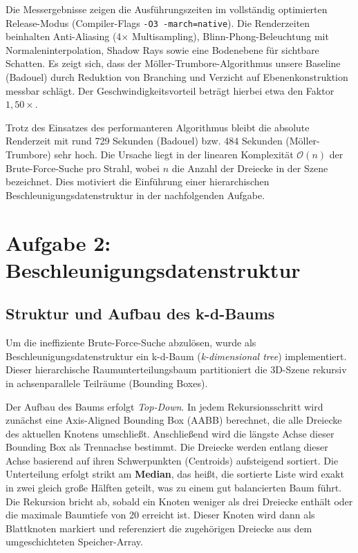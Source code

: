 \documentclass[11pt, a4paper]{article}
\begin{document}
Die Messergebnisse zeigen die Ausführungszeiten im vollständig optimierten Release-Modus (Compiler-Flags \texttt{-O3 -march=native}). Die Renderzeiten beinhalten Anti-Aliasing (4$\times$ Multisampling), Blinn-Phong-Beleuchtung mit Normaleninterpolation, Shadow Rays sowie eine Bodenebene für sichtbare Schatten. Es zeigt sich, dass der Möller-Trumbore-Algorithmus unsere Baseline (Badouel) durch Reduktion von Branching und Verzicht auf Ebenenkonstruktion messbar schlägt. Der Geschwindigkeitsvorteil beträgt hierbei etwa den Faktor $1{,}50\times$.

Trotz des Einsatzes des performanteren Algorithmus bleibt die absolute Renderzeit mit rund 729 Sekunden (Badouel) bzw. 484 Sekunden (Möller-Trumbore) sehr hoch. Die Ursache liegt in der linearen Komplexität $\mathcal{O}(n)$ der Brute-Force-Suche pro Strahl, wobei $n$ die Anzahl der Dreiecke in der Szene bezeichnet. Dies motiviert die Einführung einer hierarchischen Beschleunigungsdatenstruktur in der nachfolgenden Aufgabe.

\section{Aufgabe 2: Beschleunigungsdatenstruktur}

\subsection{Struktur und Aufbau des k-d-Baums}

Um die ineffiziente Brute-Force-Suche abzulösen, wurde als Beschleunigungsdatenstruktur ein k-d-Baum (\textit{k-dimensional tree}) implementiert. Dieser hierarchische Raumunterteilungsbaum partitioniert die 3D-Szene rekursiv in achsenparallele Teilräume (Bounding Boxes). 

Der Aufbau des Baums erfolgt \textit{Top-Down}. In jedem Rekursionsschritt wird zunächst eine Axis-Aligned Bounding Box (AABB) berechnet, die alle Dreiecke des aktuellen Knotens umschließt. Anschließend wird die längste Achse dieser Bounding Box als Trennachse bestimmt. Die Dreiecke werden entlang dieser Achse basierend auf ihren Schwerpunkten (Centroids) aufsteigend sortiert. 
Die Unterteilung erfolgt strikt am \textbf{Median}, das heißt, die sortierte Liste wird exakt in zwei gleich große Hälften geteilt, was zu einem gut balancierten Baum führt. Die Rekursion bricht ab, sobald ein Knoten weniger als drei Dreiecke enthält oder die maximale Baumtiefe von 20 erreicht ist. Dieser Knoten wird dann als Blattknoten markiert und referenziert die zugehörigen Dreiecke aus dem umgeschichteten Speicher-Array.
\end{document}
